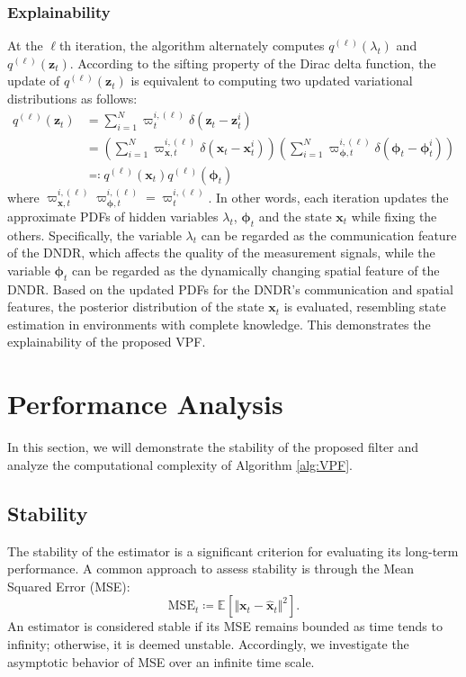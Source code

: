 \documentclass[10pt,twocolumn,twoside]{IEEEtran}
\newcommand{\E}[2][]{ \mathbb{E}_{#1}\left[#2\right] } %
\newcommand{\fs}{\text{.}} %
\newcommand{\x}{{ \bm{x} }}
\newcommand{\z}{{ \bm{z} }}
\begin{document}
\subsubsection{Explainability} %
At the $\ell$th iteration, the algorithm alternately computes $q^{(\ell)}(\lambda_t)$ and $q^{(\ell)}(\z_t)$. According to the sifting property of the Dirac delta function, the update of $q^{(\ell)}(\z_t)$ is equivalent to computing two updated variational distributions as follows:
\begin{equation*}
\begin{split}
    q^{(\ell)}(\z_t) &= \sum_{i=1}^N\varpi_t^{i,(\ell)}\delta(\z_t-\z_t^i) \\
    &= \left(\sum_{i=1}^N\varpi_{\x,t}^{i,(\ell)}\delta(\x_t-\x_t^i)\right)\left(\sum_{i=1}^N\varpi_{\bm\phi,t}^{i,(\ell)}\delta(\bm\phi_t-\bm\phi_t^i)\right) \\
    &\eqqcolon q^{(\ell)}(\x_t)q^{(\ell)}(\bm\phi_t)
\end{split}
\end{equation*}
where $\varpi_{\x,t}^{i,(\ell)}\varpi_{\bm\phi,t}^{i,(\ell)}=\varpi_t^{i,(\ell)}$.
In other words, each iteration updates the approximate PDFs of hidden variables $\lambda_t$, $\bm\phi_t$ and the state $\x_t$ while fixing the others. Specifically, the variable $\lambda_t$ can be regarded as the communication feature of the DNDR, which affects the quality of the measurement signals, while the variable $\bm\phi_t$ can be regarded as the dynamically changing spatial feature of the DNDR. Based on the updated PDFs for the DNDR's communication and spatial features, the posterior distribution of the state $\x_t$ is evaluated, resembling state estimation in environments with complete knowledge. This demonstrates the explainability of the proposed VPF.


\section{Performance Analysis} \label{sec:analysis}
In this section, we will demonstrate the stability of the proposed filter and analyze the computational complexity of Algorithm \ref{alg:VPF}.

\subsection{Stability}
The stability of the estimator is a significant criterion for evaluating its long-term performance. A common approach to assess stability is through the Mean Squared Error (MSE):
$$
\mathrm{MSE}_t \coloneqq \E{\Vert\x_t-\hat\x_t\Vert^2} \fs
$$
An estimator is considered stable if its MSE remains bounded as time tends to infinity; otherwise, it is deemed unstable. Accordingly, we investigate the asymptotic behavior of MSE over an infinite time scale.
\end{document}
